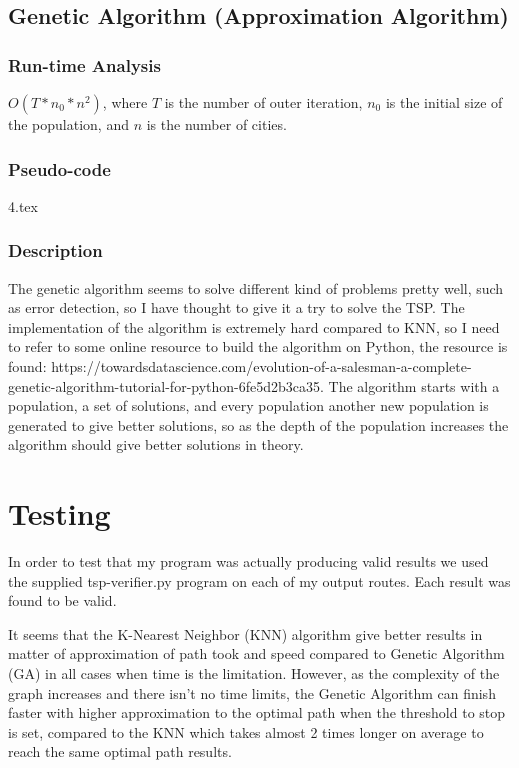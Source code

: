 \documentclass[onecolumn, draftclsnofoot,10pt, compsoc]{IEEEtran}
\begin{document}
\newpage
\subsection{Genetic Algorithm (Approximation Algorithm)}
\subsubsection{Run-time Analysis}
$O(T * n_0 * n^2)$, where $T$ is the number of outer iteration, $n_0$ is the initial size of the population, and $n$ is the number of cities.

\subsubsection{Pseudo-code}
{4.tex}
\subsubsection{Description}
The genetic algorithm seems to solve different kind of problems pretty well, such as error detection, so I have thought to give it a try to solve the TSP. The implementation of the algorithm is extremely hard compared to KNN, so I need to refer to some online resource to build the algorithm on Python, the resource is found: https://towardsdatascience.com/evolution-of-a-salesman-a-complete-genetic-algorithm-tutorial-for-python-6fe5d2b3ca35. The algorithm starts with a population, a set of solutions, and every population another new population is generated to give better solutions, so as the depth of the population increases the algorithm should give better solutions in theory.

\newpage
\section{Testing}
In order to test that my program was actually producing valid results we used the supplied tsp-verifier.py program on each of my output routes. Each result was found to be valid.

It seems that the K-Nearest Neighbor (KNN) algorithm give better results in matter of approximation of path took and speed compared to Genetic Algorithm (GA) in all cases when time is the limitation. However, as the complexity of the graph increases and there isn't no time limits, the Genetic Algorithm can finish faster with higher approximation to the optimal path when the threshold to stop is set, compared to the KNN which takes almost 2 times longer on average to reach the same optimal path results.
\end{document}
